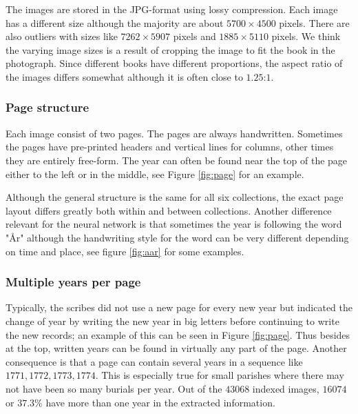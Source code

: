 The images are stored in the JPG-format using lossy compression. Each image has a different size although the majority are about $5700 \times 4500$ pixels. There are also outliers with sizes like $7262 \times 5907$ pixels and $1885 \times 5110$ pixels. We think the varying image sizes is a result of cropping the image to fit the book in the photograph.
Since different books have different proportions, the aspect ratio of the images differs somewhat although it is often close to $1.25$:$1$.

\subsubsection{Page structure}

Each image consist of two pages. The pages are always handwritten. Sometimes the pages have pre-printed headers and vertical lines for columns, other times they are entirely free-form.
The year can often be found near the top of the page either to the left or in the middle, see Figure \ref{fig:page} for an example.



Although the general structure is the same for all six collections, the exact page layout differs greatly both within and between collections. Another difference relevant for the neural network is that sometimes the year is following the word "\r{A}r" although the handwriting style for the word can be very different depending on time and place, see figure \ref{fig:aar} for some examples.


\subsubsection{Multiple years per page}

Typically, the scribes did not use a new page for every new year but indicated the change of year by writing the new year in big letters before continuing to write the new records; an example of this can be seen in Figure \ref{fig:page}.
Thus besides at the top, written years can be found in virtually any part of the page. Another consequence is that a page can contain several years in a sequence like $1771, 1772, 1773, 1774$. This is especially true for small parishes where there may not have been so many burials per year. Out of the $43068$ indexed images, $16074$ or $37.3\%$ have more than one year in the extracted information.

